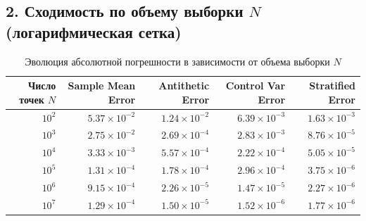 \documentclass[11pt,a4paper]{article}
\begin{document}
\subsection{2. Сходимость по объему выборки $N$ (логарифмическая сетка)}
\begin{table}[h!]
\centering
\small
\begin{tabular}{rrrrr}
\toprule
\textbf{Число точек $N$} & \textbf{Sample Mean Error} & \textbf{Antithetic Error} & \textbf{Control Var Error} & \textbf{Stratified Error} \\
\midrule
$10^2$ & $5.37 \times 10^{-2}$ & $1.24 \times 10^{-2}$ & $6.39 \times 10^{-3}$ & $1.63 \times 10^{-3}$ \\
$10^3$ & $2.75 \times 10^{-2}$ & $2.69 \times 10^{-4}$ & $2.83 \times 10^{-3}$ & $8.76 \times 10^{-5}$ \\
$10^4$ & $3.33 \times 10^{-3}$ & $5.57 \times 10^{-4}$ & $2.22 \times 10^{-4}$ & $5.05 \times 10^{-5}$ \\
$10^5$ & $1.31 \times 10^{-4}$ & $1.78 \times 10^{-4}$ & $2.96 \times 10^{-4}$ & $3.75 \times 10^{-6}$ \\
$10^6$ & $9.15 \times 10^{-4}$ & $2.26 \times 10^{-5}$ & $1.47 \times 10^{-5}$ & $2.27 \times 10^{-6}$ \\
$10^7$ & $1.29 \times 10^{-4}$ & $1.50 \times 10^{-5}$ & $1.52 \times 10^{-6}$ & $1.77 \times 10^{-6}$ \\
\bottomrule
\end{tabular}
\caption{Эволюция абсолютной погрешности в зависимости от объема выборки $N$}
\end{table}
\end{document}
